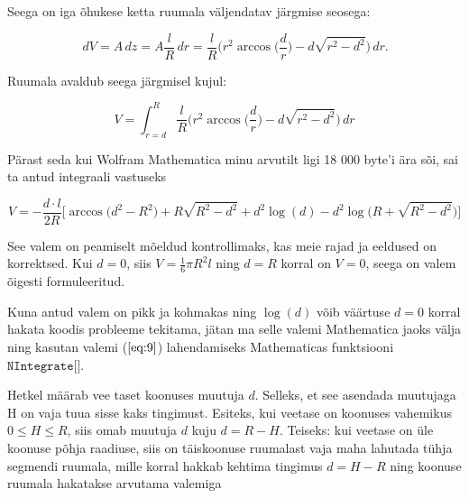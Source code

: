 \documentclass[a4paper]{article}
\begin{document}
\begin{flushleft}
Seega on iga õhukese ketta ruumala väljendatav järgmise seosega:
\end{flushleft}

\begin{equation}
\,dV = A \,dz = A \frac{l}{R} \,dr = \frac{l}{R} \bigg( r^2 \arccos\bigg( \frac{d}{r} \bigg) - d \sqrt{r^2 - d^2} \bigg)\,dr .
\end{equation}

\begin{flushleft}
Ruumala avaldub seega järgmisel kujul:
\end{flushleft}

\begin{equation} \label{eq:9}
V = \int_{r=d}^{R} \frac{l}{R} \bigg( r^2 \arccos\bigg( \frac{d}{r} \bigg) - d \sqrt{r^2 - d^2} \bigg)\,dr
\end{equation}

\begin{flushleft}
Pärast seda kui Wolfram Mathematica minu arvutilt ligi 18 000 byte'i ära sõi, sai ta antud integraali vastuseks
\end{flushleft}

 
\begin{equation}
V = -\frac{d \cdot l}{2 R} \bigg[ \arccos\big(d^2 - R^2\big) + R\sqrt{R^2-d^2} + d^2 \log(d)-d^2\log\bigg(R + \sqrt{R^2 - d^2}\bigg) \bigg]
\end{equation}

\begin{flushleft}
See valem on peamiselt mõeldud kontrollimaks, kas meie rajad ja eeldused on korrektsed. Kui $d=0$, siis $V = \frac{1}{6}\pi R^2 l$ ning $d=R$ korral on $V=0$, seega on valem õigesti formuleeritud.
\vspace{2.5mm}

Kuna antud valem on pikk ja kohmakas ning $\log(d)$ võib väärtuse $d=0$ korral hakata koodis probleeme tekitama, jätan ma selle valemi Mathematica jaoks välja ning kasutan valemi ($\ref{eq:9}$) lahendamiseks Mathematicas funktsiooni $\texttt{NIntegrate[]}$.
\vspace{2.5mm}

Hetkel määrab vee taset koonuses muutuja $d$. Selleks, et see asendada muutujaga H on vaja tuua sisse kaks tingimust. Esiteks, kui veetase on koonuses vahemikus $0 \leq H \leq R$, siis omab muutuja $d$ kuju $d = R-H$. Teiseks: kui veetase on üle koonuse põhja raadiuse, siis on täiskoonuse ruumalast vaja maha lahutada tühja segmendi ruumala, mille korral hakkab kehtima tingimus $d = H-R$ ning koonuse ruumala hakatakse arvutama valemiga  
\end{flushleft}
\end{document}
